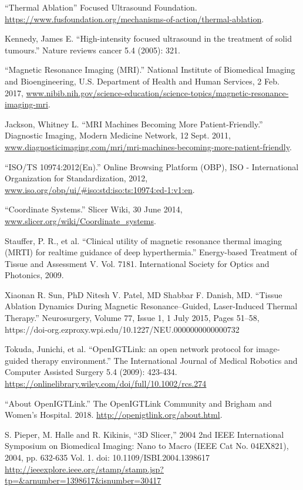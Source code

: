 \documentclass[12pt]{report}
\begin{document}
\begin{thebibliography}{99}
 ``Thermal Ablation'' Focused Ultrasound Foundation. \url{https://www.fusfoundation.org/mechanisms-of-action/thermal-ablation}.

 Kennedy, James E. ``High-intensity focused ultrasound in the treatment of solid tumours.'' Nature reviews cancer 5.4 (2005): 321.

 ``Magnetic Resonance Imaging (MRI).'' National Institute of Biomedical Imaging and Bioengineering, U.S. Department of Health and Human Services, 2 Feb. 2017, \url{www.nibib.nih.gov/science-education/science-topics/magnetic-resonance-imaging-mri}.

 Jackson, Whitney L. ``MRI Machines Becoming More Patient-Friendly.'' Diagnostic Imaging, Modern Medicine Network, 12 Sept. 2011, \url{www.diagnosticimaging.com/mri/mri-machines-becoming-more-patient-friendly}.

 ``ISO/TS 10974:2012(En).'' Online Browsing Platform (OBP), ISO - International Organization for Standardization, 2012, \url{www.iso.org/obp/ui/#iso:std:iso:ts:10974:ed-1:v1:en}.

 ``Coordinate Systems.'' Slicer Wiki, 30 June 2014, \url{www.slicer.org/wiki/Coordinate_systems}.

 Stauffer, P. R., et al. ``Clinical utility of magnetic resonance thermal imaging (MRTI) for realtime guidance of deep hyperthermia.'' Energy-based Treatment of Tissue and Assessment V. Vol. 7181. International Society for Optics and Photonics, 2009.

 Xiaonan R. Sun, PhD  Nitesh V. Patel, MD  Shabbar F. Danish, MD. ``Tissue Ablation Dynamics During Magnetic Resonance–Guided, Laser-Induced Thermal Therapy.'' Neurosurgery, Volume 77, Issue 1, 1 July 2015, Pages 51–58, https://doi-org.ezproxy.wpi.edu/10.1227/NEU.0000000000000732

 Tokuda, Junichi, et al. ``OpenIGTLink: an open network protocol for image‐guided therapy environment.'' The International Journal of Medical Robotics and Computer Assisted Surgery 5.4 (2009): 423-434. \url{https://onlinelibrary.wiley.com/doi/full/10.1002/rcs.274}

 ``About OpenIGTLink.'' The OpenIGTLink Community and Brigham and Women's Hospital. 2018. \url{http://openigtlink.org/about.html}.

 S. Pieper, M. Halle and R. Kikinis, ``3D Slicer,'' 2004 2nd IEEE International Symposium on Biomedical Imaging: Nano to Macro (IEEE Cat No. 04EX821), 2004, pp. 632-635 Vol. 1. doi: 10.1109/ISBI.2004.1398617 \url{http://ieeexplore.ieee.org/stamp/stamp.jsp?tp=&arnumber=1398617&isnumber=30417}


\end{thebibliography}
\end{document}
